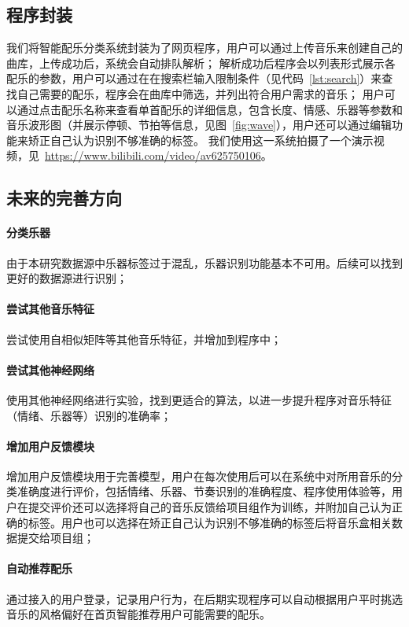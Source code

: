 \documentclass[a4paper,utf8,10pt]{article}
\begin{document}
\subsection{程序封装}

我们将智能配乐分类系统封装为了网页程序，用户可以通过上传音乐来创建自己的曲库，上传成功后，系统会自动排队解析；
解析成功后程序会以列表形式展示各配乐的参数，用户可以通过在在搜索栏输入限制条件（见代码~\ref{lst:search}）来查找自己需要的配乐，程序会在曲库中筛选，并列出符合用户需求的音乐；
用户可以通过点击配乐名称来查看单首配乐的详细信息，包含长度、情感、乐器等参数和音乐波形图（并展示停顿、节拍等信息，见图~\ref{fig:wave}），用户还可以通过编辑功能来矫正自己认为识别不够准确的标签。
我们使用这一系统拍摄了一个演示视频，见~\url{https://www.bilibili.com/video/av625750106}。

\subsection{未来的完善方向}

\newcommand{\skpv}{\vspace{-10pt}}
\paragraph{分类乐器} 由于本研究数据源中乐器标签过于混乱，乐器识别功能基本不可用。后续可以找到更好的数据源进行识别；
\skpv\paragraph{尝试其他音乐特征} 尝试使用自相似矩阵等其他音乐特征，并增加到程序中；
\skpv\paragraph{尝试其他神经网络} 使用其他神经网络进行实验，找到更适合的算法，以进一步提升程序对音乐特征（情绪、乐器等）识别的准确率；
\skpv\paragraph{增加用户反馈模块} 增加用户反馈模块用于完善模型，用户在每次使用后可以在系统中对所用音乐的分类准确度进行评价，包括情绪、乐器、节奏识别的准确程度、程序使用体验等，用户在提交评价还可以选择将自己的音乐反馈给项目组作为训练，并附加自己认为正确的标签。用户也可以选择在矫正自己认为识别不够准确的标签后将音乐盒相关数据提交给项目组；
\skpv\paragraph{自动推荐配乐} 通过接入的用户登录，记录用户行为，在后期实现程序可以自动根据用户平时挑选音乐的风格偏好在首页智能推荐用户可能需要的配乐。
\end{document}
